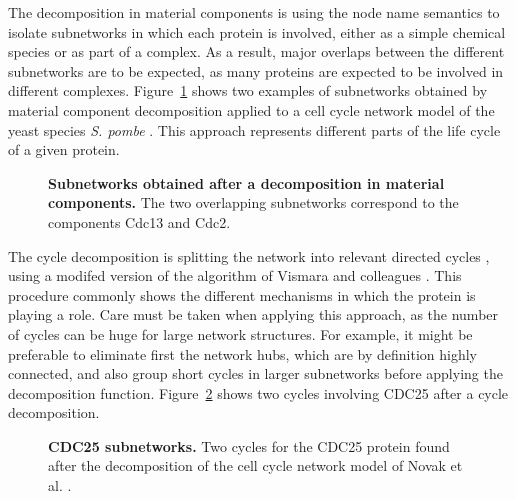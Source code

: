\documentclass[10pt]{bmc_article}
\newenvironment{bmcformat}{\baselineskip20pt\sloppy\setboolean{publ}{false}}{\baselineskip20pt\sloppy}
\begin{document}
\begin{bmcformat}
The decomposition in material components is using the node name semantics to
isolate subnetworks in which each protein is involved, either as a simple chemical species or as part of a complex. As a result, major overlaps between
the different subnetworks are to be expected, as many proteins are expected to be involved in
different complexes. Figure~\ref{matcdc2cdc13} shows two examples of subnetworks
obtained by material component decomposition applied to a cell cycle network
model of the yeast species \textit{S. pombe} \cite{novak1998model}. This approach represents
different parts of the life cycle of a given protein.

\begin{figure}[h]
 \caption{\label{matcdc2cdc13}  \textbf{Subnetworks obtained after a decomposition in
material components.} The two overlapping subnetworks correspond to the components Cdc13 and
Cdc2.}
\end{figure}


The cycle decomposition is splitting the network into relevant directed cycles
\cite{gleiss2001relevant}, using a modifed version of the algorithm of Vismara
and colleagues \cite{vismara1997union}. This procedure commonly shows the
different mechanisms in which the protein is playing a role. Care must
be taken when applying this approach, as the number of cycles can be huge for
large network structures. For example, it might be preferable to eliminate first
the network hubs, which are by definition highly connected, and also group short
cycles in larger subnetworks before applying the decomposition function.
Figure~\ref{mphasecdc25cycles} shows two
cycles involving CDC25 after a cycle decomposition.

\begin{figure}[h]
 \caption{\label{mphasecdc25cycles}  \textbf{CDC25 subnetworks.}
      Two cycles for the CDC25 protein found after the decomposition of the cell cycle network model of Novak et al. \cite{novak1998model}.}
\end{figure}


\end{bmcformat}
\end{document}
